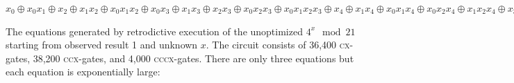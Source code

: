 \documentclass[aps,prl,twocolumn,superscriptaddress,floatfix,notitlepage]{revtex4-2}
\newcommand{\cx}{\textsc{cx}}
\newcommand{\ccx}{\textsc{ccx}}
\newcommand{\cccx}{\textsc{cccx}}
\begin{document}
\bigskip

$x_0 \oplus x_0x_1 \oplus x_2 \oplus x_1x_2 \oplus x_0x_1x_2 \oplus
x_0x_3 \oplus x_1x_3 \oplus x_2x_3 \oplus x_0x_2x_3 \oplus
x_0x_1x_2x_3 \oplus x_4 \oplus x_1x_4 \oplus x_0x_1x_4 \oplus
x_0x_2x_4 \oplus x_1x_2x_4 \oplus x_3x_4 \oplus x_0x_3x_4 \oplus
x_0x_1x_3x_4 \oplus x_2x_3x_4 \oplus x_1x_2x_3x_4 \oplus
x_0x_1x_2x_3x_4 \oplus x_0x_5 \oplus x_1x_5 \oplus x_2x_5 \oplus
x_0x_2x_5 \oplus x_0x_1x_2x_5 \oplus x_3x_5 \oplus x_1x_3x_5 \oplus
x_0x_1x_3x_5 \oplus x_0x_2x_3x_5 \oplus x_1x_2x_3x_5 \oplus x_4x_5
\oplus x_0x_4x_5 \oplus x_0x_1x_4x_5 \oplus x_2x_4x_5 \oplus
x_1x_2x_4x_5 \oplus x_0x_1x_2x_4x_5 \oplus x_0x_3x_4x_5 \oplus
x_1x_3x_4x_5 \oplus x_2x_3x_4x_5 \oplus x_0x_2x_3x_4x_5 \oplus
x_0x_1x_2x_3x_4x_5 = 0$

\bigskip

The equations generated by retrodictive execution of the unoptimized
$4^x \mod{21}$ starting from observed result 1 and unknown $x$. The
circuit consists of 36,400 \cx-gates, 38,200 \ccx-gates, and 4,000
\cccx-gates. There are only three equations but each equation is
exponentially large:

\bigskip
\end{document}
